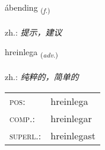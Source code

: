 \documentclass[frontgrid, backgrid]{flacards}\usepackage[]{graphicx}\usepackage[]{xcolor}
\begin{document}
\renewcommand{\blhead}{\vskip5pt {\small\bfseries\footnotesize Nafnorð | 名词 }}
\renewcommand{\bcfoot}{\vskip5pt \hspace{2pt}{\small\bfseries\footnotesize 3K}}


{ábending \small{\textsubscript{(\textit{f.})}} \\[1ex] %
\textphonetic{[auːpɛntiŋk]} \\
zh.: \emph{提示，建议} \\  [2ex]
\renewcommand*{\arraystretch}{0.8}
}

\renewcommand{\flhead}{\vskip5pt \fboxsep=0pt {\small\bfseries\footnotesize Atviksorð | 副词}}
\renewcommand{\fcfoot}{\vskip5pt \fboxsep=0pt \hspace{2pt}{\small\bfseries\footnotesize 3K}}

\renewcommand{\blhead}{\vskip5pt {\small\bfseries\footnotesize Atviksorð | 副词 }}
\renewcommand{\bcfoot}{\vskip5pt \hspace{2pt}{\small\bfseries\footnotesize 3K}}


{hreinlega \small{\textsubscript{(\textit{adv.})}} \\[1ex] %
\textphonetic{[r̥eiːnlɛɣa]} \\
zh.: \emph{纯粹的，简单的} \\  [2ex]
\renewcommand*{\arraystretch}{0.8}
\begin{tabular}{ll}
\textsc{pos}: & hreinlega \\ 
\textsc{comp.}: & hreinlegar \\ 
\textsc{superl.}: & hreinlegast \\
\end{tabular}
}

\renewcommand{\flhead}{\vskip5pt \fboxsep=0pt {\small\bfseries\footnotesize Lýsingarorð | 形容词}}
\renewcommand{\fcfoot}{\vskip5pt \fboxsep=0pt \hspace{2pt}{\small\bfseries\footnotesize 3K}}
\end{document}
